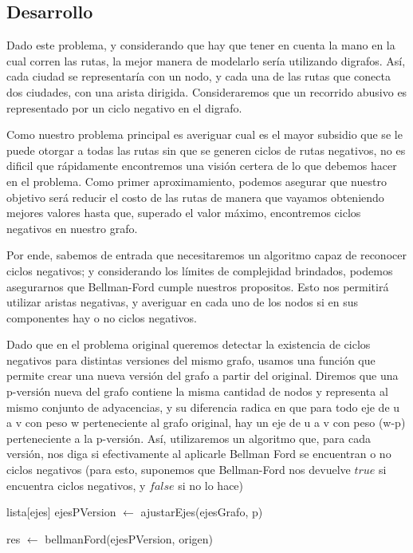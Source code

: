 \subsection{Desarrollo}
Dado este problema, y considerando que hay que tener en cuenta la mano en la cual corren las rutas, la mejor manera de modelarlo sería utilizando digrafos. Así, cada ciudad se representaría con un nodo, y cada una de las rutas que conecta dos ciudades, con una arista dirigida. Consideraremos que un recorrido abusivo es representado por un ciclo negativo en el digrafo.

Como nuestro problema principal es averiguar cual es el mayor subsidio que se le puede otorgar a todas las rutas sin que se generen ciclos de rutas negativos, no es dificil que rápidamente encontremos una visión certera de lo que debemos hacer en el problema. Como primer aproximamiento, podemos asegurar que nuestro objetivo será reducir el costo de las rutas de manera que vayamos obteniendo mejores valores hasta que, superado el valor máximo, encontremos ciclos negativos en nuestro grafo.

Por ende, sabemos de entrada que necesitaremos un algoritmo capaz de reconocer ciclos negativos; y considerando los límites de complejidad brindados, podemos asegurarnos que Bellman-Ford cumple nuestros propositos. Esto nos permitirá utilizar aristas negativas, y averiguar en cada uno de los nodos si en sus componentes hay o no ciclos negativos.

Dado que en el problema original queremos detectar la existencia de ciclos negativos para distintas versiones del mismo grafo, usamos una función que permite crear una nueva versión del grafo a partir del original. Diremos que una p-versión nueva del grafo contiene la misma cantidad de nodos y representa al mismo conjunto de adyacencias, y su diferencia radica en que para todo eje de u a v con peso w perteneciente al grafo original, hay un eje de u a v con peso (w-p) perteneciente a la p-versión. Así, utilizaremos un algoritmo que, para cada versión, nos diga si efectivamente al aplicarle Bellman Ford se encuentran o no ciclos negativos (para esto, suponemos que Bellman-Ford nos devuelve $true$ si encuentra ciclos negativos, y $false$ si no lo hace)

\begin{algorithm}[H]
	\NoCaptionOfAlgo
	\caption{}
	
	lista[ejes] ejesPVersion $\leftarrow$ ajustarEjes(ejesGrafo, p)

	res $\leftarrow$ bellmanFord(ejesPVersion, origen)
\end{algorithm}

